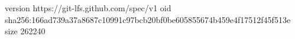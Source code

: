 version https://git-lfs.github.com/spec/v1
oid sha256:166ad739a37a8687c10991c97bcb20bf0be605855674b459e4f17512f45f513e
size 262240
